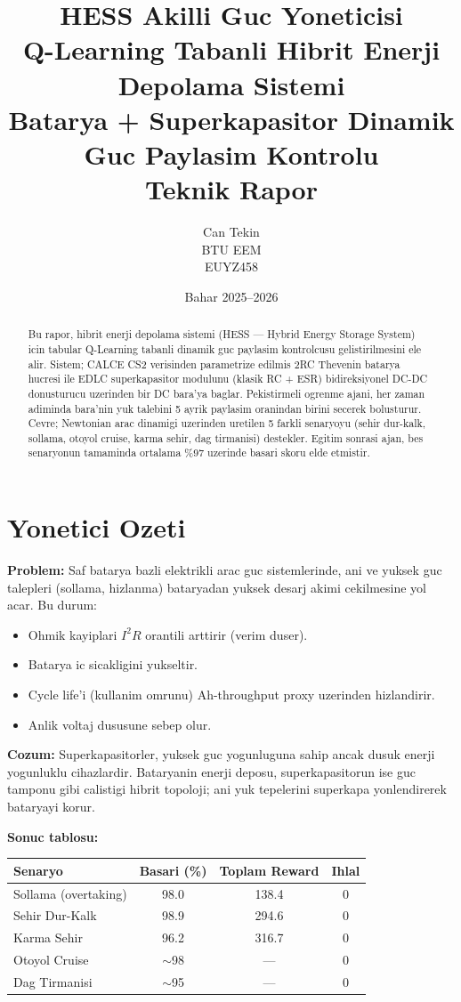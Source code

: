 \documentclass[11pt,a4paper]{article}
\title{
  \vspace{-1cm}
  \textbf{\Huge HESS Akilli Guc Yoneticisi}\\[0.3em]
  {\Large Q-Learning Tabanli Hibrit Enerji Depolama Sistemi}\\[0.3em]
  {\large Batarya + Superkapasitor Dinamik Guc Paylasim Kontrolu}\\[1em]
  {\normalsize Teknik Rapor}
}
\author{Can Tekin \\ \small BTU EEM \\ \small EUYZ458}
\date{Bahar 2025--2026}
\begin{document}
\maketitle
\thispagestyle{empty}

\begin{abstract}
\noindent Bu rapor, hibrit enerji depolama sistemi (HESS --- Hybrid Energy Storage System) icin tabular Q-Learning tabanli dinamik guc paylasim kontrolcusu gelistirilmesini ele alir. Sistem; CALCE CS2 verisinden parametrize edilmis 2RC Thevenin batarya hucresi ile EDLC superkapasitor modulunu (klasik RC + ESR) bidireksiyonel DC-DC donusturucu uzerinden bir DC bara'ya baglar. Pekistirmeli ogrenme ajani, her zaman adiminda bara'nin yuk talebini 5 ayrik paylasim oranindan birini secerek bolusturur. Cevre; Newtonian arac dinamigi uzerinden uretilen 5 farkli senaryoyu (sehir dur-kalk, sollama, otoyol cruise, karma sehir, dag tirmanisi) destekler. Egitim sonrasi ajan, bes senaryonun tamaminda ortalama \%97 uzerinde basari skoru elde etmistir.
\end{abstract}

\tableofcontents
\newpage

\section{Yonetici Ozeti}

\textbf{Problem:} Saf batarya bazli elektrikli arac guc sistemlerinde, ani ve yuksek guc talepleri (sollama, hizlanma) bataryadan yuksek desarj akimi cekilmesine yol acar. Bu durum:
\begin{itemize}
  \item Ohmik kayiplari $I^2 R$ orantili arttirir (verim duser).
  \item Batarya ic sicakligini yukseltir.
  \item Cycle life'i (kullanim omrunu) Ah-throughput proxy uzerinden hizlandirir.
  \item Anlik voltaj dususune sebep olur.
\end{itemize}

\textbf{Cozum:} Superkapasitorler, yuksek guc yogunluguna sahip ancak dusuk enerji yogunluklu cihazlardir. Bataryanin enerji deposu, superkapasitorun ise guc tamponu gibi calistigi hibrit topoloji; ani yuk tepelerini superkapa yonlendirerek bataryayi korur.

\textbf{Sonuc tablosu:}
\begin{center}
\begin{tabular}{lccc}
\toprule
Senaryo & Basari (\%) & Toplam Reward & Ihlal \\
\midrule
Sollama (overtaking)  & 98.0 & 138.4 & 0 \\
Sehir Dur-Kalk        & 98.9 & 294.6 & 0 \\
Karma Sehir           & 96.2 & 316.7 & 0 \\
Otoyol Cruise         & $\sim$98 & --- & 0 \\
Dag Tirmanisi         & $\sim$95 & --- & 0 \\
\bottomrule
\end{tabular}
\end{center}
\end{document}
